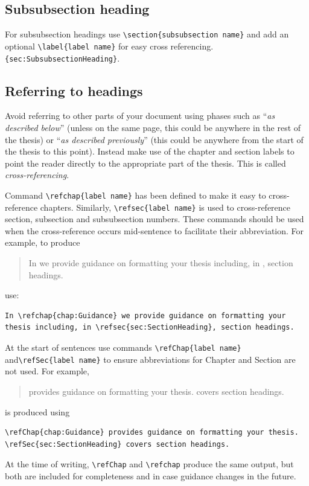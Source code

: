 \documentclass[12pt,oneside]{book} %
\begin{document}
\subsection{Subsubsection heading}
\label{sec:SubsubsectionHeading}
For subsubsection headings use \verb#\section{subsubsection name}# and add an optional \linebreak\verb#\label{label name}# for easy cross referencing. \eg \verb#{sec:SubsubsectionHeading}#.

\subsection{Referring to headings}
\label{sec:ReferringToHeadings}
Avoid referring to other parts of your document using phases such as ``{\em as described below}'' (unless on the same page, this could be anywhere in the rest of the thesis) or ``{\em as described previously}''  (this could be anywhere from the start of the thesis to this point). Instead make use of the chapter and section labels to point the reader directly to the appropriate part of the thesis. This is called {\em cross-referencing}.

Command \verb#\refchap{label name}# has been defined to make it easy to cross-refer\-ence chapters. Similarly, \verb#\refsec{label name}# is used to cross-reference section, subsection and subsubsection numbers. These commands should be used  when the cross-reference occurs mid-sentence to facilitate their abbreviation. For example, to produce
\begin{quote}
In  we provide guidance on formatting your thesis including, in , section headings. 
\end{quote}
use:
\begin{verbatim}
In \refchap{chap:Guidance} we provide guidance on formatting your 
thesis including, in \refsec{sec:SectionHeading}, section headings. 
\end{verbatim}

At the start of sentences use commands \verb#\refChap{label name}# and\linebreak \verb#\refSec{label name}# to ensure abbreviations for Chapter and Section are not used. For example,
\begin{quote}
 provides guidance on formatting your thesis.  covers section headings. 
\end{quote}
is produced using
\begin{verbatim}
\refChap{chap:Guidance} provides guidance on formatting your thesis. 
\refSec{sec:SectionHeading} covers section headings. 
\end{verbatim}
At the time of writing, \verb#\refChap# and \verb#\refchap# produce the same output, but both are included for completeness and in case guidance changes in the future.
\end{document}
